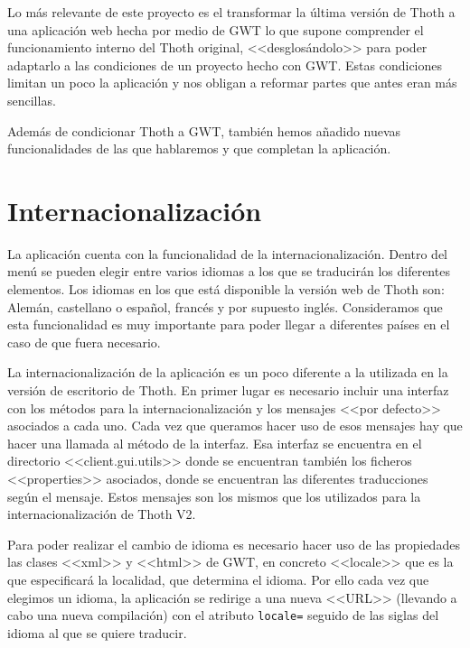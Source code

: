 
Lo más relevante de este proyecto es el transformar la última versión de Thoth a una aplicación web hecha por medio de GWT lo que supone comprender el funcionamiento interno del Thoth original, <<desglosándolo>> para poder adaptarlo a las condiciones de un proyecto hecho con GWT.
Estas condiciones limitan un poco la aplicación y nos obligan a reformar partes que antes eran más sencillas.

Además de condicionar Thoth a GWT, también hemos añadido nuevas funcionalidades de las que hablaremos y que completan la aplicación.



\section{Internacionalización}
La aplicación cuenta con la funcionalidad de la internacionalización. Dentro del menú se pueden elegir entre varios idiomas a los que se traducirán los diferentes elementos. Los idiomas en los que está disponible la versión web de Thoth son: Alemán, castellano o español, francés y por supuesto inglés. Consideramos que esta funcionalidad es muy importante para poder llegar a diferentes países en el caso de que fuera necesario.

La internacionalización de la aplicación es un poco diferente a la utilizada en la versión de escritorio de Thoth. En primer lugar es necesario incluir una interfaz con los métodos para la internacionalización y los mensajes <<por defecto>> asociados a cada uno. Cada vez que queramos hacer uso de esos mensajes hay que hacer una llamada al método de la interfaz. Esa interfaz se encuentra en el directorio <<client.gui.utils>> donde se encuentran también los ficheros <<properties>> asociados, donde se encuentran las diferentes traducciones según el mensaje. Estos mensajes son los mismos que los utilizados para la internacionalización de Thoth V2.

Para poder realizar el cambio de idioma es necesario hacer uso de las propiedades las clases <<xml>> y <<html>> de GWT, en concreto <<locale>> que es la que especificará la localidad, que determina el idioma. Por ello cada vez que elegimos un idioma, la aplicación se redirige a una nueva <<URL>> (llevando a cabo una nueva compilación) con el atributo \texttt{locale=} seguido de las siglas del idioma al que se quiere traducir.



